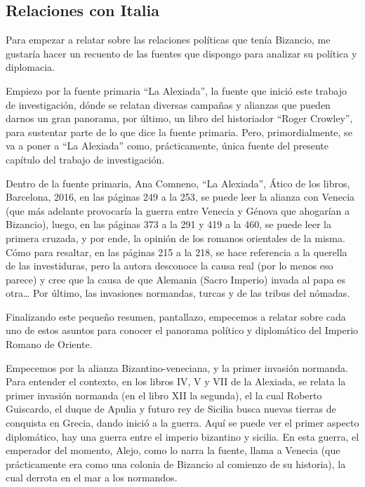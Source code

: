 \subsection{Relaciones con Italia}
Para empezar a relatar sobre las relaciones políticas que tenía Bizancio,
me gustaría hacer un recuento de las fuentes que dispongo para analizar
su política y diplomacia.

Empiezo por la fuente primaria “La Alexiada”, 
la fuente que inició este trabajo de investigación, 
dónde se relatan diversas campañas y alianzas 
que pueden darnos un gran panorama, 
por último, un libro del historiador “Roger Crowley”, 
para sustentar parte de lo que dice la fuente primaria. 
Pero, primordialmente, 
se va a poner a “La Alexiada” como, prácticamente, 
única fuente del presente capítulo del trabajo de investigación.

Dentro de la fuente primaria,  Ana Comneno, “La Alexiada”, 
Ático de los libros, Barcelona, 2016, en las páginas 249 a la 253, 
se puede leer la alianza con Venecia (que más adelante provocaría 
la guerra entre Venecia y Génova que ahogarían a Bizancio), luego, 
en las páginas 373 a la 291 y 419 a la 460, se puede leer la 
primera cruzada, y por ende, la opinión de los romanos 
orientales de la misma. Cómo para resaltar, en las páginas 
215 a la 218, se hace referencia a la querella de las investiduras, 
pero la autora desconoce la causa real (por lo menos eso parece) 
y cree que la causa de que Alemania (Sacro Imperio) invada al 
papa es otra… Por último, las invasiones normandas, 
turcas y de las tribus del nómadas. 

Finalizando este pequeño resumen, pantallazo, empecemos a 
relatar sobre cada uno de estos asuntos para conocer el 
panorama político y diplomático del Imperio Romano de Oriente.

Empecemos por la alianza Bizantino-veneciana, y la primer 
invasión normanda. Para entender el contexto, en los libros 
IV, V y VII de la Alexiada, se relata la primer invasión normanda 
(en el libro XII la segunda), el la cual Roberto Guiscardo, 
el duque de Apulia y futuro rey de Sicilia busca nuevas tierras de 
conquista en Grecia, dando inició a la guerra. Aquí se puede ver el 
primer aspecto diplomático, hay una guerra entre el imperio bizantino 
y sicilia. En esta guerra, el emperador del momento, Alejo, 
como lo narra la fuente, llama a Venecia (que prácticamente 
era como una colonia de Bizancio al comienzo de su historia), 
la cual derrota en el mar a los normandos.

